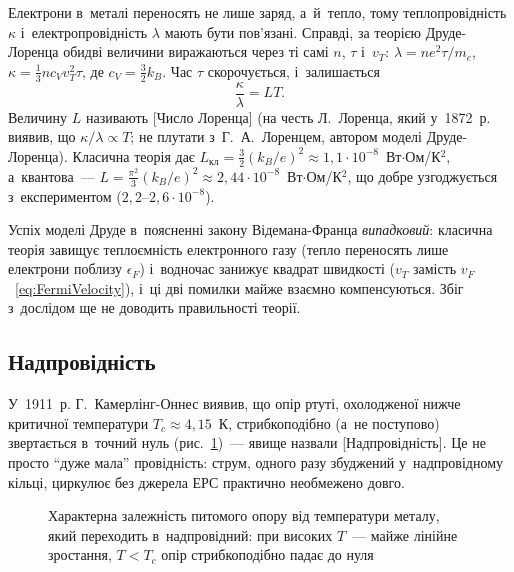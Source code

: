 Електрони в~металі переносять не лише заряд, а~й~тепло, тому теплопровідність $\kappa$
і~електропровідність $\lambda$ мають бути пов'язані. Справді, за теорією Друде-Лоренца
обидві величини виражаються через ті самі $n$, $\tau$ і~$v_T$: $\lambda=ne^2\tau/m_e$,
$\kappa=\tfrac13nc_Vv_T^2\tau$, де $c_V=\tfrac32k_B$. Час $\tau$ скорочується,
і~залишається
\begin{equation}\label{eq:WiedemannFranz}
	\frac{\kappa}{\lambda} = L T.
\end{equation}
Величину $L$ називають [Число Лоренца] (на честь Л.~Лоренца, який у~1872~р. виявив,
що $\kappa/\lambda\propto T$; не плутати з~Г.~А.~Лоренцем, автором моделі Друде-Лоренца).
Класична теорія дає
$L_{\text{кл}}=\tfrac32(k_B/e)^2\approx1{,}1\cdot10^{-8}$~Вт$\cdot$Ом/К$^2$,
а~квантова~--- $L=\tfrac{\pi^2}{3}(k_B/e)^2\approx2{,}44\cdot10^{-8}$~Вт$\cdot$Ом/К$^2$,
що добре узгоджується з~експериментом ($2{,}2$--$2{,}6\cdot10^{-8}$).

\begin{Attention}
	Успіх моделі Друде в~поясненні закону Відемана-Франца \emph{випадковий}: класична
	теорія завищує теплоємність електронного газу (тепло переносять лише електрони поблизу
	$\epsilon_F$) і~водночас занижує квадрат швидкості ($v_T$ замість
	$v_F$~\eqref{eq:FermiVelocity}), і~ці дві помилки майже взаємно компенсуються. Збіг
	з~дослідом ще не доводить правильності теорії.
\end{Attention}


\subsection*{Надпровідність}


У~1911~р. Г.~Камерлінг-Оннес виявив, що опір ртуті, охолодженої нижче критичної
температури $T_c\approx4{,}15$~К, стрибкоподібно (а~не поступово) звертається в~точний
нуль (рис.~\ref{pic:superconductorR})~--- явище назвали [Надпровідність]. Це не
просто \enquote{дуже мала} провідність: струм, одного разу збуджений у~надпровідному
кільці, циркулює без джерела ЕРС практично необмежено довго.

\begin{figure}[h!]\centering
	\caption{Характерна залежність питомого опору від температури металу, який переходить
	в~надпровідний: при високих $T$~--- майже лінійне зростання, $T<T_c$ опір
	стрибкоподібно падає до нуля}
	\label{pic:superconductorR}
\end{figure}

